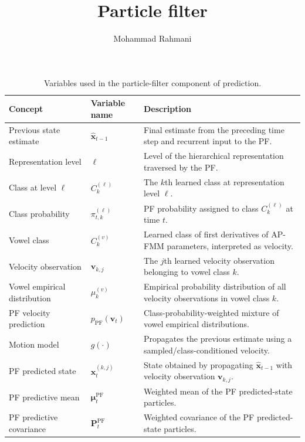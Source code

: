 \documentclass[a4paper]{article}
\title{Particle filter}
\date{}
\author{Mohammad Rahmani}
\begin{document}
\maketitle
\begin{table}[H]
\centering
\small
\begin{tabular}{p{} p{} p{}}
\hline
\textbf{Concept} & \textbf{Variable name} & \textbf{Description} \\
\hline
Previous state estimate & $\hat{\mathbf{x}}_{t-1}$ & Final estimate from the preceding time step and recurrent input to the PF. \\
Representation level & $\ell$ & Level of the hierarchical representation traversed by the PF. \\
Class at level $\ell$ & $C_k^{(\ell)}$ & The $k$th learned class at representation level $\ell$. \\
Class probability & $\pi_{t,k}^{(\ell)}$ & PF probability assigned to class $C_k^{(\ell)}$ at time $t$. \\
Vowel class & $C_k^{(v)}$ & Learned class of first derivatives of AP-FMM parameters, interpreted as velocity. \\
Velocity observation & $\mathbf{v}_{k,j}$ & The $j$th learned velocity observation belonging to vowel class $k$. \\
Vowel empirical distribution & $\mu_k^{(v)}$ & Empirical probability distribution of all velocity observations in vowel class $k$. \\
PF velocity prediction & $p_{\mathrm{PF}}(\mathbf{v}_t)$ & Class-probability-weighted mixture of vowel empirical distributions. \\
Motion model & $g(\cdot)$ & Propagates the previous estimate using a sampled/class-conditioned velocity. \\
PF predicted state & $\mathbf{x}_t^{(k,j)}$ & State obtained by propagating $\hat{\mathbf{x}}_{t-1}$ with velocity observation $\mathbf{v}_{k,j}$. \\
PF predictive mean & $\boldsymbol{\mu}_t^{\mathrm{PF}}$ & Weighted mean of the PF predicted-state particles. \\
PF predictive covariance & $\mathbf{P}_t^{\mathrm{PF}}$ & Weighted covariance of the PF predicted-state particles. \\
\hline
\end{tabular}
\caption{Variables used in the particle-filter component of prediction.}
\label{tab:particle-filter-variables}
\end{table}
\end{document}

